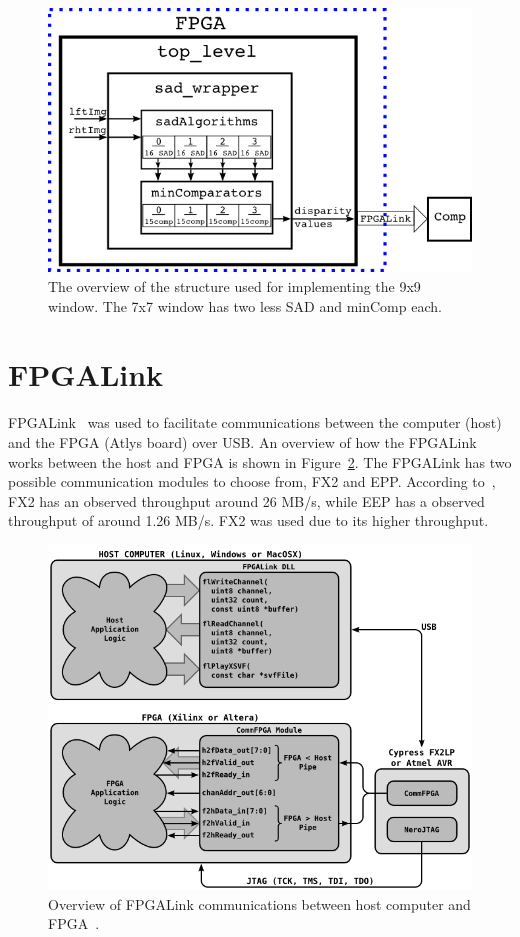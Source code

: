\begin{figure}[h]
	\begin{center}
		\includegraphics[width=150mm]{figures/top_level_rtl.png}
		\captionfonts
		\caption{The overview of the structure used for implementing the 9x9 window. The 7x7 window has two less SAD and minComp each.}
		\label{fig:topLevel_rtl}
	\end{center}
\end{figure}

\section{FPGALink}
\label{sec:fpgalink}

FPGALink~\cite{fpgalink} was used to facilitate communications between the computer (host) and the FPGA (Atlys board) over USB. An overview of how the FPGALink works between the host and FPGA is shown in Figure~\ref{fig:fpgalink}. The FPGALink has two possible communication modules to choose from, FX2 and EPP. According to~\cite{fpgalink}, FX2 has an observed throughput around 26 MB/s, while EEP has a observed throughput of around 1.26 MB/s. FX2 was used due to its higher throughput.

\begin{figure}[h]
	\begin{center}
		\includegraphics[width=150mm]{figures/fpgalinkOverview.png}
		\captionfonts
		\caption{Overview of FPGALink communications between host computer and FPGA~\cite{fpgalink}.}
		\label{fig:fpgalink}
	\end{center}
\end{figure}

